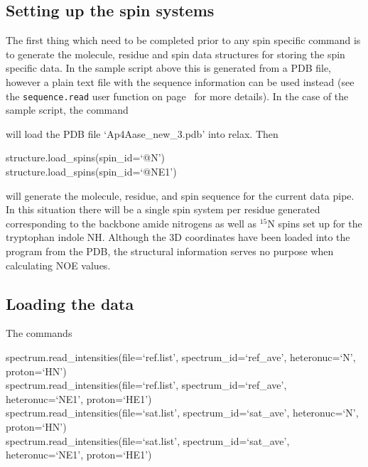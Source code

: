 
\subsection{Setting up the spin systems}

The first thing which need to be completed prior to any spin specific command is to generate the molecule, residue and spin data structures for storing the spin specific data.  In the sample script above this is generated from a PDB file, however a plain text file with the sequence information can be used instead (see the \texttt{sequence.read} user function on page~\pageref{uf: sequence.read} for more details).  In the case of the sample script, the command


will load the PDB file `Ap4Aase\_new\_3.pdb' into relax.  Then

\begin{exampleenv}
structure.load\_spins(spin\_id=`@N') \\
structure.load\_spins(spin\_id=`@NE1')
\end{exampleenv}

will generate the molecule, residue, and spin sequence for the current data pipe.  In this situation there will be a single spin system per residue generated corresponding to the backbone amide nitrogens as well as $^{15}$N spins set up for the tryptophan indole NH.  Although the 3D coordinates have been loaded into the program from the PDB, the structural information serves no purpose when calculating NOE values.



\subsection{Loading the data}

The commands

\begin{exampleenv}
spectrum.read\_intensities(file=`ref.list', spectrum\_id=`ref\_ave', heteronuc=`N', proton=`HN') \\
spectrum.read\_intensities(file=`ref.list', spectrum\_id=`ref\_ave', heteronuc=`NE1', proton=`HE1') \\
spectrum.read\_intensities(file=`sat.list', spectrum\_id=`sat\_ave', heteronuc=`N', proton=`HN') \\
spectrum.read\_intensities(file=`sat.list', spectrum\_id=`sat\_ave', heteronuc=`NE1', proton=`HE1')
\end{exampleenv}

